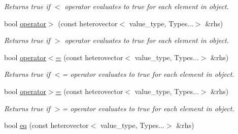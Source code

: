 \begin{DoxyCompactItemize}
\begin{DoxyCompactList}\small\item\em Returns true if $<$ operator evaluates to true for each element in object. \end{DoxyCompactList}\item 
\hypertarget{classheterogeneous_1_1heterovector_3_01_t_00_01_types_8_8_8_4_a5f23c2ca5ffd6bfc52be938b3264d686}{}bool \hyperlink{classheterogeneous_1_1heterovector_3_01_t_00_01_types_8_8_8_4_a5f23c2ca5ffd6bfc52be938b3264d686}{operator$>$} (const heterovector$<$ value\+\_\+type, Types...$>$ \&rhs)\label{classheterogeneous_1_1heterovector_3_01_t_00_01_types_8_8_8_4_a5f23c2ca5ffd6bfc52be938b3264d686}

\begin{DoxyCompactList}\small\item\em Returns true if $>$ operator evaluates to true for each element in object. \end{DoxyCompactList}\item 
\hypertarget{classheterogeneous_1_1heterovector_3_01_t_00_01_types_8_8_8_4_a876ca5d0f0beb3350be5c907bce36e94}{}bool \hyperlink{classheterogeneous_1_1heterovector_3_01_t_00_01_types_8_8_8_4_a876ca5d0f0beb3350be5c907bce36e94}{operator$<$=} (const heterovector$<$ value\+\_\+type, Types...$>$ \&rhs)\label{classheterogeneous_1_1heterovector_3_01_t_00_01_types_8_8_8_4_a876ca5d0f0beb3350be5c907bce36e94}

\begin{DoxyCompactList}\small\item\em Returns true if $<$= operator evaluates to true for each element in object. \end{DoxyCompactList}\item 
\hypertarget{classheterogeneous_1_1heterovector_3_01_t_00_01_types_8_8_8_4_aa6ff47154ef360efedf6998473b17545}{}bool \hyperlink{classheterogeneous_1_1heterovector_3_01_t_00_01_types_8_8_8_4_aa6ff47154ef360efedf6998473b17545}{operator$>$=} (const heterovector$<$ value\+\_\+type, Types...$>$ \&rhs)\label{classheterogeneous_1_1heterovector_3_01_t_00_01_types_8_8_8_4_aa6ff47154ef360efedf6998473b17545}

\begin{DoxyCompactList}\small\item\em Returns true if $>$= operator evaluates to true for each element in object. \end{DoxyCompactList}\item 
\hypertarget{classheterogeneous_1_1heterovector_3_01_t_00_01_types_8_8_8_4_aaa661a1a3e4a8ac307495825e8000eeb}{}bool \hyperlink{classheterogeneous_1_1heterovector_3_01_t_00_01_types_8_8_8_4_aaa661a1a3e4a8ac307495825e8000eeb}{eq} (const heterovector$<$ value\+\_\+type, Types...$>$ \&rhs)\label{classheterogeneous_1_1heterovector_3_01_t_00_01_types_8_8_8_4_aaa661a1a3e4a8ac307495825e8000eeb}


\end{DoxyCompactItemize}
